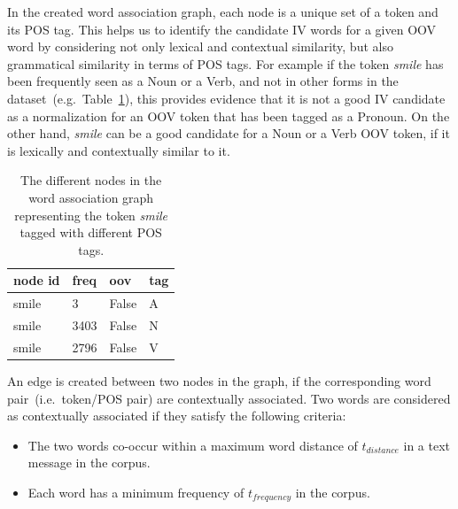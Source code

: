 \documentclass[a4paper,onesided,12pt]{report}
\begin{document}


In the created word association graph, each node is a unique set of a token and its POS tag. This helps us to identify the candidate IV words for a given OOV word by considering not only lexical and contextual similarity, but also grammatical similarity in terms of POS tags. For example if the token \textit{smile} has been frequently seen as a Noun or a Verb, and not in other forms in the dataset~(e.g.~Table~\ref{tab:nodes}), this provides evidence that it is not a good IV candidate as a normalization for an OOV token that has  been tagged as a Pronoun. On the other hand, \textit{smile} can be a good candidate for a Noun or a Verb OOV token, if it is lexically and contextually similar to it.

\begin{table}[hbt]
  \caption{The different nodes in the word association graph representing the token \textit{smile} tagged with different POS tags.}
  \centering
  \begin{tabular}[tc]{|l|l|l|l|}
    \hline
    node id & freq & oov & tag \\
    \hline
    smile & 3 & False & A \\
    smile & 3403 & False & N \\
    smile & 2796 & False & V \\
    \hline
  \end{tabular}
\label{tab:nodes}
\end{table}

An edge is created between two nodes in the graph, if the corresponding word pair~(i.e.~token/POS pair) are contextually associated. Two words are considered as contextually associated if they satisfy the following criteria:

\begin{itemize}
\item The two words co-occur within a maximum word distance of $t_{distance}$ in a text message in the corpus.
\item Each word has a minimum frequency of $t_{frequency}$ in the corpus.
\end{itemize}
\end{document}
